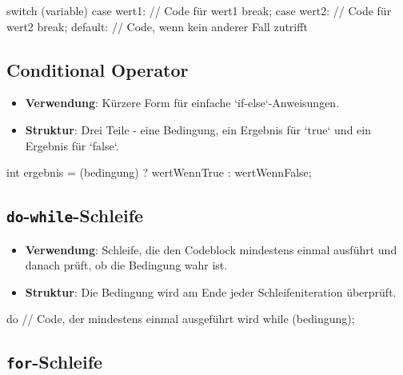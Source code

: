 \documentclass[a4paper,10pt, dvipsnames]{report}
\newcommand{\javaInLine}[1]{\texttt{#1}}
\begin{document}
\begin{javacodebox}
switch (variable) {
    case wert1:
        // Code für wert1
        break;
    case wert2:
        // Code für wert2
        break;
    default:
        // Code, wenn kein anderer Fall zutrifft
}
\end{javacodebox}



\subsection{Conditional Operator}

\begin{itemize}
    \item \textbf{Verwendung}: Kürzere Form für einfache `if-else`-Anweisungen.
    \item \textbf{Struktur}: Drei Teile - eine Bedingung, ein Ergebnis für `true` und ein Ergebnis für `false`.
\end{itemize}

\begin{javacodebox}
    int ergebnis = (bedingung) ? wertWennTrue : wertWennFalse;
\end{javacodebox}


\subsection{\javaInLine{do}-\javaInLine{while}-Schleife}

\begin{itemize}
    \item \textbf{Verwendung}: Schleife, die den Codeblock mindestens einmal ausführt und danach prüft, ob die Bedingung wahr ist.
    \item \textbf{Struktur}: Die Bedingung wird am Ende jeder Schleifeniteration überprüft.
\end{itemize}

\begin{javacodebox}
    do {
        // Code, der mindestens einmal ausgeführt wird
    } while (bedingung);
\end{javacodebox}



\subsection{\javaInLine{for}-Schleife}
\end{document}
